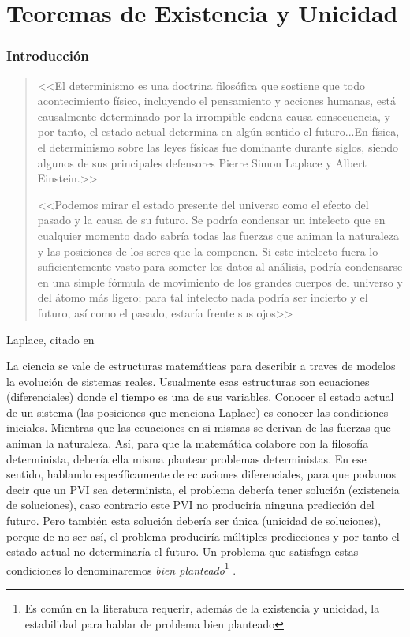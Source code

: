 \chapter{Teoremas de Existencia y Unicidad}



\subsection{Introducción}

\begin{quote}

 
 <<El determinismo es una doctrina filosófica que sostiene que todo acontecimiento físico, incluyendo el pensamiento y acciones humanas, está causalmente determinado por la irrompible cadena causa-consecuencia, y por tanto, el estado actual determina en algún sentido el futuro...En física, el determinismo sobre las leyes físicas fue dominante durante siglos, siendo algunos de sus principales defensores Pierre Simon Laplace y Albert Einstein.>>
 
<<Podemos mirar el estado presente del universo como el efecto del pasado y la causa de su futuro. Se podría condensar un intelecto que en cualquier momento dado sabría todas las fuerzas que animan la naturaleza y las posiciones de los seres que la componen. Si este intelecto fuera lo suficientemente vasto para someter los datos al análisis, podría condensarse en una simple fórmula de movimiento de los grandes cuerpos del universo y del átomo más ligero; para tal intelecto nada podría ser incierto y el futuro, así como el pasado, estaría frente sus ojos>>

\end{quote}
\begin{flushright}
Laplace, citado en \cite{ wiki:determinismo}
\end{flushright}


La ciencia se vale de estructuras matemáticas para describir a traves de modelos la evolución de sistemas reales. Usualmente esas estructuras son ecuaciones (diferenciales) donde el tiempo es una de sus variables. Conocer el estado actual de un sistema (las posiciones que menciona Laplace) es conocer las condiciones iniciales. Mientras que las ecuaciones en si mismas se derivan de  las fuerzas que animan la naturaleza.  Así, para que la matemática colabore con la filosofía determinista, debería ella misma plantear problemas deterministas.  En ese sentido, hablando específicamente de ecuaciones diferenciales, para que podamos decir que un PVI sea determinista, el problema debería tener solución (existencia de soluciones), caso contrario este PVI no produciría ninguna predicción del futuro. Pero también esta solución debería ser única (unicidad de soluciones), porque de no ser así, el problema produciría múltiples predicciones y por tanto el estado actual 
no determinaría el futuro. Un problema que satisfaga estas condiciones lo denominaremos \emph{bien planteado}\footnote{Es común en la literatura requerir, además de la existencia y unicidad, la estabilidad para hablar de problema bien planteado} . 

